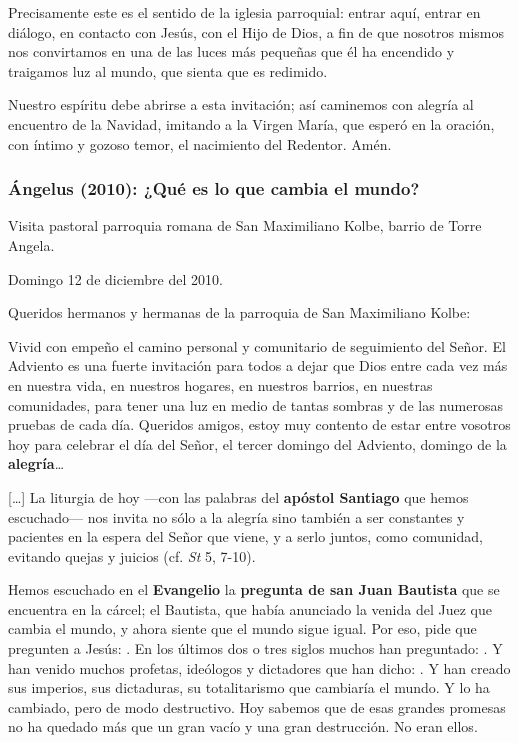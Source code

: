 \begin{body}
\begin{body}
Precisamente este es el sentido de la iglesia parroquial: entrar aquí, entrar en diálogo, en contacto con Jesús, con el Hijo de Dios, a fin de que nosotros mismos nos convirtamos en una de las luces más pequeñas que él ha encendido y traigamos luz al mundo, que sienta que es redimido.

Nuestro espíritu debe abrirse a esta invitación; así caminemos con alegría al encuentro de la Navidad, imitando a la Virgen María, que esperó en la oración, con íntimo y gozoso temor, el nacimiento del Redentor. Amén.

\subsubsection{Ángelus (2010): ¿Qué es lo que cambia el mundo?}

Visita pastoral parroquia romana de San Maximiliano Kolbe, barrio de Torre Angela.

Domingo 12 de diciembre del 2010.

Queridos hermanos y hermanas de la parroquia de San Maximiliano Kolbe:

Vivid con empeño el camino personal y comunitario de seguimiento del Señor. El Adviento es una fuerte invitación para todos a dejar que Dios entre cada vez más en nuestra vida, en nuestros hogares, en nuestros barrios, en nuestras comunidades, para tener una luz en medio de tantas sombras y de las numerosas pruebas de cada día. Queridos amigos, estoy muy contento de estar entre vosotros hoy para celebrar el día del Señor, el tercer domingo del Adviento, domingo de la \textbf{alegría}\ldots{}

[\ldots{}] La liturgia de hoy ---con las palabras del \textbf{apóstol Santiago} que hemos escuchado--- nos invita no sólo a la alegría sino también a ser constantes y pacientes en la espera del Señor que viene, y a serlo juntos, como comunidad, evitando quejas y juicios (cf. \emph{St} 5, 7-10).

Hemos escuchado en el \textbf{Evangelio} la \textbf{pregunta de san Juan Bautista} que se encuentra en la cárcel; el Bautista, que había anunciado la venida del Juez que cambia el mundo, y ahora siente que el mundo sigue igual. Por eso, pide que pregunten a Jesús: . En los últimos dos o tres siglos muchos han preguntado: . Y han venido muchos profetas, ideólogos y dictadores que han dicho: . Y han creado sus imperios, sus dictaduras, su totalitarismo que cambiaría el mundo. Y lo ha cambiado, pero de modo destructivo. Hoy sabemos que de esas grandes promesas no ha quedado más que un gran vacío y una gran destrucción. No eran ellos.


\end{body}
\end{body}
